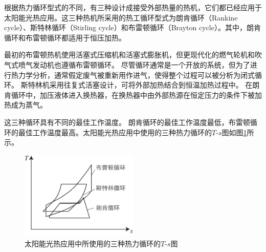根据热力循环型式的不同，有三种设计成接受外部热量的热机，它们都已经应用于太阳能光热应用。这三种热机所采用的热工循环型式为朗肯循环（Rankine cycle）、斯特林循环（Stirling cycle）和布雷顿循环（Brayton cycle）。其中，朗肯循环和布雷顿循环都适用于恒压加热。

最初的布雷顿热机使用活塞式压缩机和活塞式膨胀机，但更现代化的燃气轮机和吹气式喷气发动机也遵循布雷顿循环。 尽管循环通常是一个开放的系统，但为了进行热力学分析，通常假定废气被重新用作进气，使得整个过程可以被分析为闭式循环。
斯特林机采用往复式活塞设计，可将外部加热结合到恒温加热过程中。
在朗肯循环中，加压液体进入换热器，在换热器中由外部热源在恒定压力的条件下被加热成为蒸气。

这三种循环具有不同的最佳工作温度。 朗肯循环的最佳工作温度最低，布雷顿循环的最佳工作温度最高。太阳能光热应用中使用的三种热力循环的$T$-$s$图如图\ref{fig:cycles}所示。

\begin{figure}[ht]
\centering 
\includegraphics[width=0.5\textwidth]{fig/cycles}
\caption{太阳能光热应用中所使用的三种热力循环的$T$-$s$图}\label{fig:cycles}
\end{figure}

